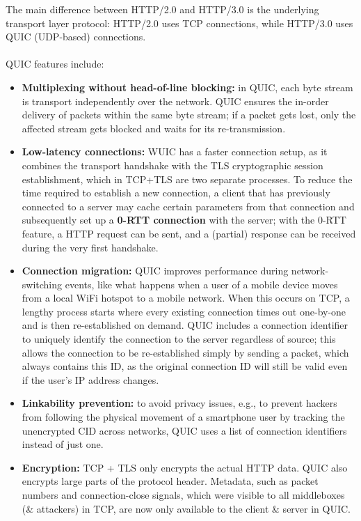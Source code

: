 \documentclass[a4paper,11pt]{article}
\begin{document}
The main difference between HTTP/2.0 and HTTP/3.0 is the underlying transport layer protocol:
HTTP/2.0 uses TCP connections, while HTTP/3.0 uses QUIC (UDP-based) connections.
\\\\
QUIC features include:
\begin{itemize}
    \item   \textbf{Multiplexing without head-of-line blocking:} in QUIC, each byte stream is transport independently over the network.
            QUIC ensures the in-order delivery of packets within the same byte stream;
            if a packet gets lost, only the affected stream gets blocked and waits for its re-transmission.
    \item   \textbf{Low-latency connections:} WUIC has a faster connection setup, as it combines the transport handshake with the TLS cryptographic session establishment, which in TCP+TLS are two separate processes.
            To reduce the time required to establish a new connection, a client that has previously connected to a server may cache certain parameters from that connection and subsequently set up a \textbf{0-RTT connection} with the server;
            with the 0-RTT feature, a HTTP request can be sent, and a (partial) response can be received during the very first handshake.
    \item   \textbf{Connection migration:} QUIC improves performance during network-switching events, like what happens when a user of a mobile device moves from a local WiFi hotspot to a mobile network.
            When this occurs on TCP, a lengthy process starts where every existing connection times out one-by-one and is then re-established on demand.
            QUIC includes a connection identifier to uniquely identify the connection to the server regardless of source;
            this allows the connection to be re-established simply by sending a packet, which always contains this ID, as the original connection ID will still be valid even if the user's IP address changes.
    \item   \textbf{Linkability prevention: } to avoid privacy issues, e.g., to prevent hackers from following the physical movement of a smartphone user by tracking the unencrypted CID across networks, QUIC uses a list of connection identifiers instead of just one.
    \item   \textbf{Encryption:} TCP + TLS only encrypts the actual HTTP data.
            QUIC also encrypts large parts of the protocol header.
            Metadata, such as packet numbers and connection-close signals, which were visible to all middleboxes (\& attackers) in TCP, are now only available to the client \& server in QUIC.

\end{itemize}
\end{document}
